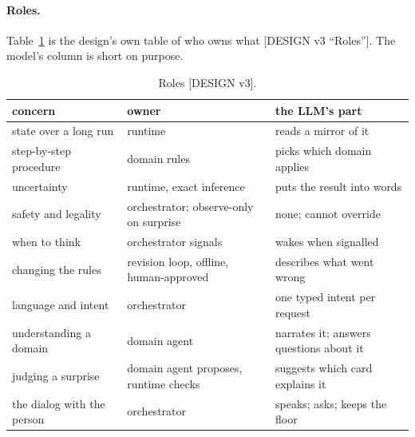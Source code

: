 \documentclass[11pt]{article}
\newcommand{\src}[1]{{\footnotesize\textsf{[#1]}}}
\begin{document}
\paragraph{Roles.} Table~\ref{tab:roles} is the design's own table of who owns what
\src{DESIGN v3 ``Roles''}. The model's column is short on purpose.

\begin{table}[t]
\centering\footnotesize
\begin{tabular}{@{}lll@{}}
\toprule
concern & owner & the LLM's part \\
\midrule
state over a long run & runtime & reads a mirror of it \\
step-by-step procedure & domain rules & picks which domain applies \\
uncertainty & runtime, exact inference & puts the result into words \\
safety and legality & orchestrator; observe-only on surprise & none; cannot override \\
when to think & orchestrator signals & wakes when signalled \\
changing the rules & revision loop, offline, human-approved & describes what went wrong \\
language and intent & orchestrator & one typed intent per request \\
understanding a domain & domain agent & narrates it; answers questions about it \\
judging a surprise & domain agent proposes, runtime checks & suggests which card explains it \\
the dialog with the person & orchestrator & speaks; asks; keeps the floor \\
\bottomrule
\end{tabular}
\caption{Roles \src{DESIGN v3}.}
\label{tab:roles}
\end{table}
\end{document}
